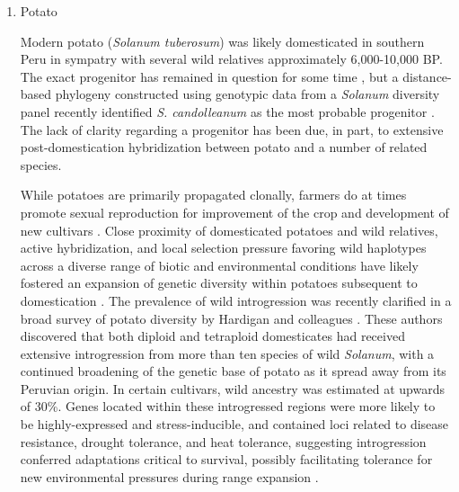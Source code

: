 \documentclass[11pt]{article}
\begin{document}
\begin{enumerate}
\item{Potato}

Modern potato (\emph{Solanum tuberosum}) was likely domesticated in southern Peru in sympatry with several wild relatives approximately 6,000-10,000 BP.
The exact progenitor has remained in question for some time \cite{huaman2002reclassification, spooner2005single, pickersgill1977origins, hawkes1988evolution}, but a distance-based phylogeny constructed using genotypic data from a \emph{Solanum} diversity panel recently identified \emph{S. candolleanum} as the most probable progenitor \cite{hardigan2015taxonomy}.
The lack of clarity regarding a progenitor has been due, in part, to extensive post-domestication hybridization between potato and a number of related species.

While potatoes are primarily propagated clonally, farmers do at times promote sexual reproduction for improvement of the crop and development of new cultivars \cite{quiros1992increase}.
Close proximity of domesticated potatoes and wild relatives, active hybridization, and local selection pressure favoring wild haplotypes across a diverse range of biotic and environmental conditions have likely fostered an expansion of genetic diversity within potatoes subsequent to domestication \cite{brush1995potato}.
The prevalence of wild introgression was recently clarified in a broad survey of potato diversity by Hardigan and colleagues \cite{hardigan2017genome}.
These authors discovered that both diploid and tetraploid domesticates had received extensive introgression from more than ten species of wild \emph{Solanum}, with a continued broadening of the genetic base of potato as it spread away from its Peruvian origin.
In certain cultivars, wild ancestry was estimated at upwards of 30\%.
Genes located within these introgressed regions were more likely to be highly-expressed and stress-inducible, and contained loci related to disease resistance, drought tolerance, and heat tolerance, suggesting introgression conferred adaptations critical to survival, possibly facilitating tolerance for new environmental pressures during range expansion \cite{hardigan2017genome}.


\end{enumerate}
\end{document}
